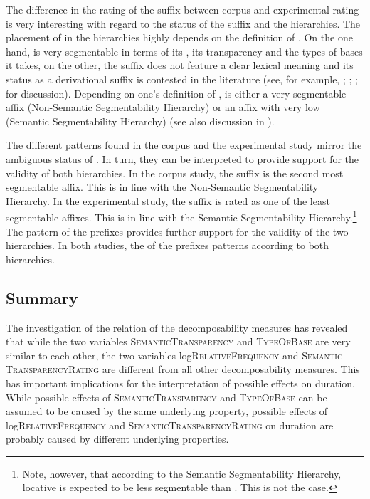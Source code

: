 The difference in the rating of the suffix  between corpus and experimental rating is very interesting with regard to the  status of the suffix and the  hierarchies. The placement of  in the  hierarchies highly depends on the definition of . On the one hand,  is very segmentable in terms of its , its transparency and the types of bases it takes, on the other, the suffix does not feature a clear lexical meaning and its status as a derivational suffix is contested in the literature (see, for example, \citealt{Zwicky.1995}; \citealt{Plag.2003}; \citealt{Giegerich.2012}; \citealt{Bauer.2013} for discussion). Depending on one's definition of ,  is either a very segmentable affix (Non-Semantic Segmentability Hierarchy) or an affix with very low  (Semantic Segmentability Hierarchy) (see also discussion in ). 

The different  patterns found in the corpus and the experimental study mirror the ambiguous  status of . In turn, they can be interpreted to provide support for the validity of both  hierarchies. 
In the corpus study, the suffix  is the second most segmentable affix. This is in line with the Non-Semantic Segmentability Hierarchy. 
In the experimental study, the suffix  is rated as one of the least segmentable affixes. This is in line with the Semantic Segmentability Hierarchy.\footnote{Note, however, that according to the Semantic Segmentability Hierarchy, locative  is expected to be less segmentable than . This is not the case. }
The  pattern of the prefixes provides further support for the validity of the two hierarchies. In both studies, the  of the prefixes patterns according to both hierarchies. 



\subsection{Summary}

The investigation of the relation of the decomposability measures has revealed that while the two variables \textsc{SemanticTransparency} and \textsc{TypeOfBase} are very similar to each other, the two variables log\textsc{RelativeFrequency} and \textsc{Semantic-TransparencyRating} are different from all other decomposability measures.
This has important implications for the interpretation of possible  effects on duration. While possible effects of \textsc{SemanticTransparency} and \textsc{TypeOfBase} can be assumed to be caused by the same underlying property, possible effects of log\textsc{RelativeFrequency} and \textsc{SemanticTransparencyRating} on duration are probably caused by different underlying properties.




